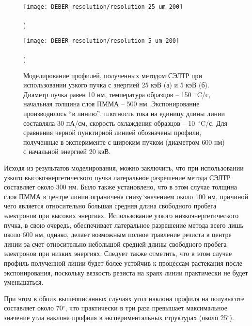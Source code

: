 \begin{figure}[h]
	\begin{minipage}{0.48\textwidth}
		\texttt{[image: DEBER\_resolution/resolution\_25\_um\_200]} \\
		\vspace{-28.7ex} \\ ) \\ \vspace{28.7ex}
	\end{minipage}
	\begin{minipage}{0.48\textwidth}
		\texttt{[image: DEBER\_resolution/resolution\_5\_um\_200]} \\
		\vspace{-28.7ex} \\ ) \\ \vspace{28.7ex}
	\end{minipage}
	\vspace{-3.5em}
	\caption{
		Моделирование профилей, полученных методом СЭЛТР при использовании узкого пучка с энергией 25 кэВ (а) и 5 кэВ (б).
		Диаметр пучка равен 10 нм, температура образцов -- 150~$^\circ$C/с, начальная толщина слоя ПММА -- 500 нм.
		Экспонирование производилось ``в линию'', плотность тока на единицу длины линии составляла 30 пА/см, скорость охлаждения образцов -- 10~$^\circ$C/с.
		Для сравнения черной пунктирной линией обозначены профили, полученные в эксперименте с широким пучком (диаметром 600 нм) с начальной энергией 20 кэВ.}
	\label{fig:DEBER_resolution}
\end{figure}

Исходя из результатов моделирования, можно заключить, что при использовании узкого высокоэнергетического пучка латеральное разрешение метода СЭЛТР составляет около 300 нм.
Было также установлено, что в этом случае толщина слоя ПММА в центре линии ограничена снизу значением около 100 нм, причиной чего является относительно большая средняя длина свободного пробега электронов при высоких энергиях.
Использование узкого низкоэнергетического пучка, в свою очередь, обеспечивает латеральное разрешение метода всего лишь около 600 нм, однако, делает возможным полное травление резиста в центре линии за счет относительно небольшой средней длины свободного пробега электронов при низких энергиях.
Следует также отметить, что в этом случае профиль полученной линии будет более устойчив к процессам растекания после экспонирования, поскольку вязкость резиста на краях линии практически не будет уменьшаться.

При этом в обоих вышеописанных случаях угол наклона профиля на полувысоте составляет около 70$^\circ$, что практически в три раза превышает максимальное значение угла наклона профиля в экспериментальных структурах \linebreak (около 25$^\circ$).
